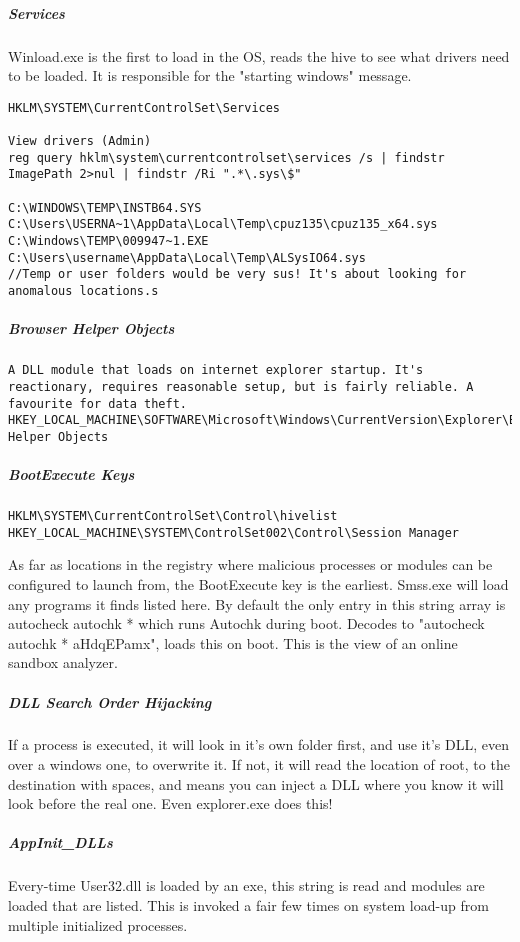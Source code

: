 \subparagraph{Services}
Winload.exe is the first to load in the OS, reads the hive to see what drivers need to be loaded. It is responsible for the "starting windows" message.
\begin{lstlisting}[label=RegistryServices,caption=Registry Service Locations]
HKLM\SYSTEM\CurrentControlSet\Services

View drivers (Admin)
reg query hklm\system\currentcontrolset\services /s | findstr ImagePath 2>nul | findstr /Ri ".*\.sys\$"

C:\WINDOWS\TEMP\INSTB64.SYS C:\Users\USERNA~1\AppData\Local\Temp\cpuz135\cpuz135_x64.sys C:\Windows\TEMP\009947~1.EXE C:\Users\username\AppData\Local\Temp\ALSysIO64.sys
//Temp or user folders would be very sus! It's about looking for anomalous locations.s
\end{lstlisting}


\subparagraph{Browser Helper Objects}
\begin{lstlisting}[label=RegistryBHO,caption=Registry BHO Locations]
A DLL module that loads on internet explorer startup. It's reactionary, requires reasonable setup, but is fairly reliable. A favourite for data theft.
HKEY_LOCAL_MACHINE\SOFTWARE\Microsoft\Windows\CurrentVersion\Explorer\Browser Helper Objects
\end{lstlisting}

\subparagraph{BootExecute Keys}
\begin{lstlisting}[label=RegistryBootExecute,caption=Registry BootExecute Locations]
HKLM\SYSTEM\CurrentControlSet\Control\hivelist
HKEY_LOCAL_MACHINE\SYSTEM\ControlSet002\Control\Session Manager
\end{lstlisting}

As far as locations in the registry where malicious processes or modules can be configured to launch from, the BootExecute key is the earliest. 
Smss.exe will load any programs it finds listed here. By default the only entry in this string array is autocheck autochk * which runs Autochk during boot.
Decodes to "autocheck autochk * aHdqEPamx", loads this on boot. This is the view of an online sandbox analyzer.

\subparagraph{DLL Search Order Hijacking}
If a process is executed, it will look in it's own folder first, and use it's DLL, even over a windows one, to overwrite it. If not, it will read the location of root, 
to the destination with spaces, and means you can inject a DLL where you know it will look before the real one. Even explorer.exe does this!

\subparagraph{AppInit\_DLLs}
Every-time User32.dll is loaded by an exe, this string is read and modules are loaded that are listed. This is invoked a fair few times on system load-up from multiple initialized processes.

